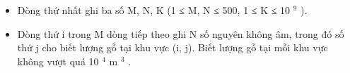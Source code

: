 \begin{itemize}
	\item Dòng thứ nhất ghi ba số M, N, K (1 ≤ M, N ≤ 500, 1 ≤ K ≤ 10 $^ 9 $ ).
	\item Dòng thứ i trong M dòng tiếp theo ghi N số nguyên không âm, trong đó số thứ j cho biết lượng gỗ tại khu vực (i, j). Biết lượng gỗ tại mỗi khu vực không vượt quá 10 $^ 4 $ m $^ 3 $ .
\end{itemize}